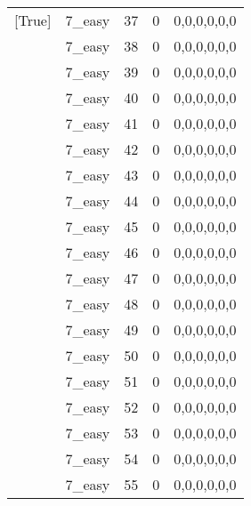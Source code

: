 \begin{tabular}{llrrl}
 [True]          & 7\_easy              &            37 &                     0 & 0,0,0,0,0,0   \\
 [True]          & 7\_easy              &            38 &                     0 & 0,0,0,0,0,0   \\
 [True]          & 7\_easy              &            39 &                     0 & 0,0,0,0,0,0   \\
 [True]          & 7\_easy              &            40 &                     0 & 0,0,0,0,0,0   \\
 [True]          & 7\_easy              &            41 &                     0 & 0,0,0,0,0,0   \\
 [True]          & 7\_easy              &            42 &                     0 & 0,0,0,0,0,0   \\
 [True]          & 7\_easy              &            43 &                     0 & 0,0,0,0,0,0   \\
 [True]          & 7\_easy              &            44 &                     0 & 0,0,0,0,0,0   \\
 [True]          & 7\_easy              &            45 &                     0 & 0,0,0,0,0,0   \\
 [True]          & 7\_easy              &            46 &                     0 & 0,0,0,0,0,0   \\
 [True]          & 7\_easy              &            47 &                     0 & 0,0,0,0,0,0   \\
 [True]          & 7\_easy              &            48 &                     0 & 0,0,0,0,0,0   \\
 [True]          & 7\_easy              &            49 &                     0 & 0,0,0,0,0,0   \\
 [True]          & 7\_easy              &            50 &                     0 & 0,0,0,0,0,0   \\
 [True]          & 7\_easy              &            51 &                     0 & 0,0,0,0,0,0   \\
 [True]          & 7\_easy              &            52 &                     0 & 0,0,0,0,0,0   \\
 [True]          & 7\_easy              &            53 &                     0 & 0,0,0,0,0,0   \\
 [True]          & 7\_easy              &            54 &                     0 & 0,0,0,0,0,0   \\
 [True]          & 7\_easy              &            55 &                     0 & 0,0,0,0,0,0   \\

\end{tabular}
